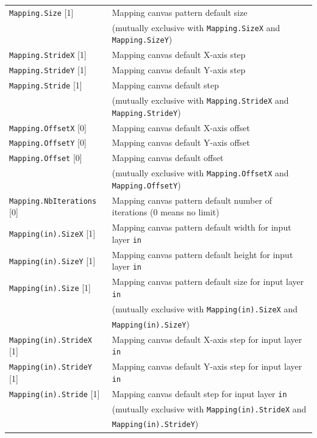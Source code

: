 \documentclass[a4paper,11pt,oneside]{article}
\begin{document}
\begin{center}
\begin{longtable}{| p{5cm} | p{10cm} | }
  \lstinline!Mapping.Size! [1] & Mapping canvas pattern default size \\
   & (mutually exclusive with \lstinline!Mapping.SizeX!
   and \lstinline!Mapping.SizeY!) \\
  \lstinline!Mapping.StrideX! [1] & Mapping canvas default X-axis step \\
  \lstinline!Mapping.StrideY! [1] & Mapping canvas default Y-axis step \\
  \lstinline!Mapping.Stride! [1] & Mapping canvas default step \\
   & (mutually exclusive with \lstinline!Mapping.StrideX!
   and \lstinline!Mapping.StrideY!) \\
  \lstinline!Mapping.OffsetX! [0] & Mapping canvas default X-axis offset \\
  \lstinline!Mapping.OffsetY! [0] & Mapping canvas default Y-axis offset \\
  \lstinline!Mapping.Offset! [0] & Mapping canvas default offset \\
   & (mutually exclusive with \lstinline!Mapping.OffsetX!
   and \lstinline!Mapping.OffsetY!) \\
  \lstinline!Mapping.NbIterations! [0] & Mapping canvas pattern default number
  of iterations (0 means no limit) \\
  \lstinline!Mapping(in).SizeX! [1] & Mapping canvas pattern default width
  for input layer \lstinline!in! \\
  \lstinline!Mapping(in).SizeY! [1] & Mapping canvas pattern default height
  for input layer \lstinline!in! \\
  \lstinline!Mapping(in).Size! [1] & Mapping canvas pattern default size
   for input layer \lstinline!in! \\
   & (mutually exclusive with \lstinline!Mapping(in).SizeX! and \\
   & \lstinline!Mapping(in).SizeY!) \\
  \lstinline!Mapping(in).StrideX! [1] & Mapping canvas default X-axis step
  for input layer \lstinline!in! \\
  \lstinline!Mapping(in).StrideY! [1] & Mapping canvas default Y-axis step
  for input layer \lstinline!in! \\
  \lstinline!Mapping(in).Stride! [1] & Mapping canvas default step
   for input layer \lstinline!in! \\
   & (mutually exclusive with \lstinline!Mapping(in).StrideX! and \\
   & \lstinline!Mapping(in).StrideY!) \\

\end{longtable}
\end{center}
\end{document}

